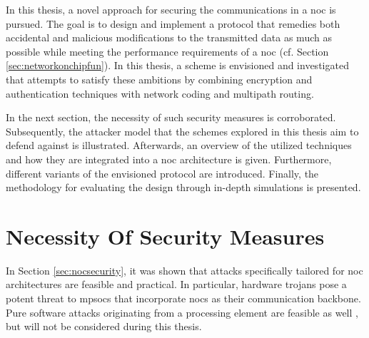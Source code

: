 In this thesis, a novel approach for securing the communications in a \gls{noc} is pursued. The goal is to design and implement a protocol that
remedies both accidental and malicious modifications to the transmitted data as much as possible while meeting the performance requirements of a \gls{noc} (cf. Section
\ref{sec:networkonchipfun}). In this thesis, a scheme is envisioned and investigated that attempts to satisfy these ambitions by combining encryption
and authentication techniques with network coding and multipath routing.

In the next section, the necessity of such security measures is corroborated. Subsequently, the attacker model that the schemes explored in this
thesis aim to defend against is illustrated. Afterwards, an overview of the utilized techniques and how they are
integrated into a \gls{noc} architecture is given. Furthermore, different variants of the envisioned protocol are introduced. Finally, the
methodology for evaluating the design through in-depth simulations is presented.

\section{Necessity Of Security Measures}\label{sec:necessityofsecurity}
In Section \ref{sec:nocsecurity}, it was shown that attacks specifically tailored for \gls{noc} architectures are feasible and practical. In
particular, hardware trojans pose a potent threat to \glspl{mpsoc} that incorporate \glspl{noc} as their communication backbone. Pure software attacks
originating from a processing element are feasible as well \cites(e.g.)(){biswas15routerattack}{kocher04embeddedsecurity}, but will not be considered
during this thesis. %

